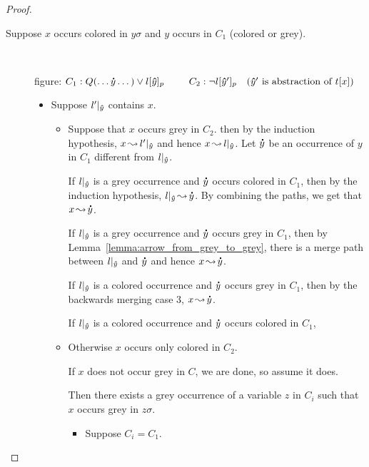 \documentclass[,%
	paper=a4,%
	DIV11, %
	twoside=false,%
	liststotoc,
	bibtotoc,
	draft=false,%
	numbers=noendperiod
]{scrartcl}
\begin{document}
\begin{proof}
\begin{description}
\begin{itemize}
\begin{itemize}
					\end{itemize}



			\end{itemize}

		\item[Suppose $x$ occurs colored in $y\sigma$ and $y$ occurs in $C_1$ (colored or grey).]
			~

			figure:
			$C_1: Q(\dots \bdot y \dots) \lor l\occat{\bhat y}{p}\quad\quad$
			$C_2: \lnot l{[\bm\hat y']_{p}}\quad(\bm\hat y' \text{ is abstraction of } t[x])$


			\begin{itemize}
				\item Suppose $l'|_{\bm\hat y}$ contains $x$.
					\begin{itemize}
							\item
					Suppose that  $x$ occurs grey in $C_2$. then by the induction hypothesis,
					$x\operatorname{\leadsto} l'|_{\bm\hat y}$ and hence 
					$x\operatorname{\leadsto} l|_{\bm\hat y}$. Let $\bm\dot y$ be an occurrence of $y$ in $C_1$ different from $l|_{\bm\hat y}$.

					If $l|_{\bm\hat y}$ is a grey occurrence and $\bm\dot y$ occurs colored in $C_1$, then by the induction hypothesis, $l|_{\bm\hat y} \operatorname{\leadsto} \bm\dot y$. By combining the paths, we get that $x\operatorname{\leadsto} \bm\dot y$.

					If $l|_{\bm\hat y}$ is a grey occurrence and $\bm\dot y$ occurs grey in $C_1$, then by Lemma~\ref{lemma:arrow_from_grey_to_grey}, there is a merge path between $l|_{\bm\hat y}$ and $\bm\dot y$ and hence $x\operatorname{\leadsto} \bm\dot y$.


					If $l|_{\bm\hat y}$ is a colored occurrence and $\bm\dot y$ occurs grey in $C_1$, then by the backwards merging case 3, $x\operatorname{\leadsto} \bm\dot y$.

					If $l|_{\bm\hat y}$ is a colored occurrence and $\bm\dot y$ occurs colored in $C_1$,  

					\item

					Otherwise $x$ occurs only colored in $C_2$.


					If $x$ does not occur grey in $C$, we are done, so assume it does.

					Then there exists a grey occurrence of a variable $z$ in $C_i$ such that $x$ occurs grey in $z\sigma$.

					\begin{itemize}
						\item Suppose $C_i = C_1$.


\end{itemize}
\end{itemize}
\end{itemize}
\end{description}
\end{proof}
\end{document}
